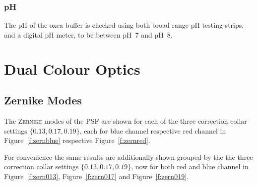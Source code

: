 \documentclass[11pt, a4paper, oneside, twocolumn]{report}
\begin{document}
\subsubsection{pH}

The pH of the \gls{oxea} buffer is checked using both broad range pH
testing strips, and a digital pH meter, to be between pH~7 and pH~8.


\section{Dual Colour Optics}


\subsection{Zernike Modes}

The \textsc{Zernike} modes of the PSF are shown for each of the three
correction collar settings $\{0.13,0.17,0.19\}$, each for blue channel
respective red channel in Figure~\ref{f:zernblue} respective
Figure~\ref{f:zernred}.

For convenience the same results are additionally shown grouped by the
the three correction collar settings $\{0.13,0.17,0.19\}$, now for
both red and blue channel in Figure~\ref{f:zern013},
Figure~\ref{f:zern017} and Figure~\ref{f:zern019}.

\end{document}
